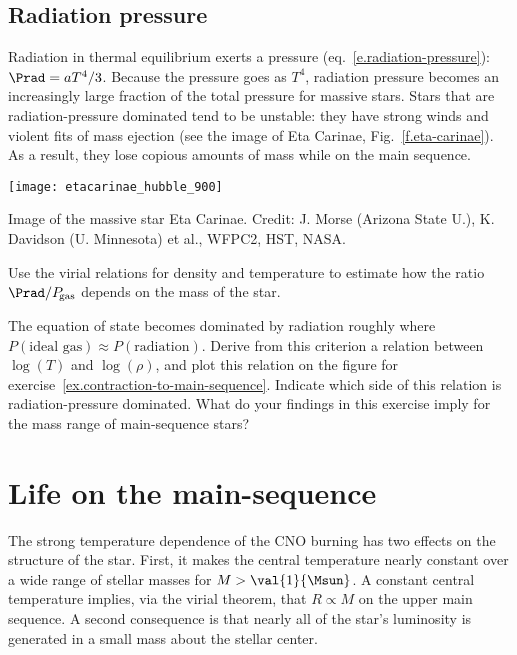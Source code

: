 \subsection{Radiation pressure}
\label{s.radiation-pressure}

Radiation in thermal equilibrium exerts a pressure (eq.~\ref{e.radiation-pressure}): $\Prad = aT^{4}/3$. Because the pressure goes as $T^{4}$, radiation pressure becomes an increasingly large fraction of the total pressure for massive stars. Stars that are radiation-pressure dominated tend to be unstable: they have strong winds and violent fits of mass ejection (see the image of Eta Carinae, Fig.~\ref{f.eta-carinae}). As a result, they lose copious amounts of mass while on the main sequence.
\begin{marginfigure}
\texttt{[image: etacarinae\_hubble\_900]}
\caption[Image of the massive star Eta Carinae]{\label{f.eta-carinae} Image of the massive star Eta Carinae. Credit: J. Morse (Arizona State U.), K. Davidson (U. Minnesota) et al., WFPC2, HST, NASA.}
\end{marginfigure}


\begin{exercisebox}
Use the virial relations for density and temperature to estimate how the ratio $\Prad/P_{\!\mathrm{gas}}$ depends on the mass of the star.
\end{exercisebox}

\begin{exercisebox}
\label{ex.maximum-stellar-mass}
The equation of state becomes dominated by radiation roughly where $P(\textrm{ideal gas}) \approx P(\textrm{radiation})$. Derive from this criterion a relation between $\log(T)$ and $\log(\rho)$, and plot this relation on the figure for exercise~\ref{ex.contraction-to-main-sequence}. Indicate which side of this relation is radiation-pressure dominated. What do your findings in this exercise imply for the mass range of main-sequence stars?
\end{exercisebox}

\section{Life on the main-sequence}

The strong temperature dependence of the CNO burning has two effects on the structure of the star. First, it makes the central temperature nearly constant over a wide range of stellar masses for $M > \val{1}{\Msun}$. A constant central temperature implies, via the virial theorem, that $R \propto M$ on the upper main sequence. A second consequence is that nearly all of the star's luminosity is generated in a small mass about the stellar center.

